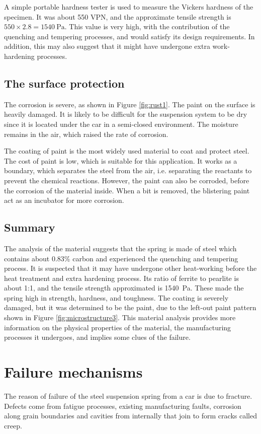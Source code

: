 \documentclass[11pt]{article}
\begin{document}
A simple portable hardness tester is used to measure the Vickers hardness of the specimen. It was about 550 VPN, and the approximate tensile strength is $550\times 2.8 = \SI{1540}{\pascal}$. This value is very high, with the contribution of the quenching and tempering processes, and would satisfy its design requirements. In addition, this may also suggest that it might have undergone extra work-hardening processes.
\subsection{The surface protection}
The corrosion is severe, as shown in Figure \ref{fig:rust1}. The paint on the surface is heavily damaged. It is likely to be difficult for the suspension system to be dry since it is located under the car in a semi-closed environment. The moisture remains in the air, which raised the rate of corrosion.  
 
The coating of paint is the most widely used material to coat and protect steel. The cost of paint is low, which is suitable for this application. It works as a boundary, which separates the steel from the air, i.e. separating the reactants to prevent the chemical reactions. However, the paint can also be corroded, before the corrosion of the material inside. When a bit is removed, the blistering paint act as an incubator for more corrosion. 
\subsection{Summary}
The analysis of the material suggests that the spring is made of steel which contains about 0.83\% carbon and experienced the quenching and tempering process. It is suspected that it may have undergone other heat-working before the heat treatment and extra hardening process. Its ratio of ferrite to pearlite is about 1:1, and the tensile strength approximated is \SI{1540}{\pascal}. These made the spring high in strength, hardness, and toughness. The coating is severely damaged, but it was determined to be the paint, due to the left-out paint pattern shown in Figure \ref{fig:microstructure3}. This material analysis provides more information on the physical properties of the material, the manufacturing processes it undergoes, and implies some clues of the failure.
\newpage
\section{Failure mechanisms}
The reason of failure of the steel suspension spring from a car is due to fracture. Defects come from fatigue processes, existing manufacturing faults, corrosion along grain boundaries and cavities from internally that join to form cracks called creep. 
\end{document}
